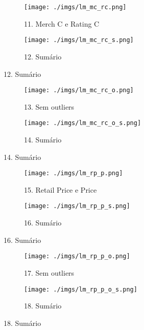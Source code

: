 \documentclass[12pt, a4paper]{article}
\begin{document}
\FloatBarrier
\begin{figure}[h]
  \begin{subfigure}[b]{0.4\textwidth}
    \texttt{[image: ./imgs/lm\_mc\_rc.png]}
    \caption*{11. Merch C e Rating C}
    \label{fig:1}
  \end{subfigure}
  \begin{subfigure}[b]{0.5\textwidth}
    \texttt{[image: ./imgs/lm\_mc\_rc\_s.png]}
    \caption*{12. Sumário}
    \label{fig:2}
  \end{subfigure}
\end{figure}
\FloatBarrier 

\FloatBarrier
\begin{figure}[h]
  \begin{subfigure}[b]{0.4\textwidth}
    \texttt{[image: ./imgs/lm\_mc\_rc\_o.png]}
    \caption*{13. Sem outliers}
    \label{fig:1}
  \end{subfigure}
  \begin{subfigure}[b]{0.5\textwidth}
    \texttt{[image: ./imgs/lm\_mc\_rc\_o\_s.png]}
    \caption*{14. Sumário}
    \label{fig:2}
  \end{subfigure}
\end{figure}
\FloatBarrier 

\FloatBarrier
\begin{figure}[h]
  \hspace{1cm}
  \begin{subfigure}[b]{0.48\textwidth}
    \texttt{[image: ./imgs/lm\_rp\_p.png]}
    \caption*{15. Retail Price e Price}
    \label{fig:1}
  \end{subfigure}
  \begin{subfigure}[b]{0.5\textwidth}
    \texttt{[image: ./imgs/lm\_rp\_p\_s.png]}
    \caption*{16. Sumário}
    \label{fig:2}
  \end{subfigure}
\end{figure}
\FloatBarrier 

\FloatBarrier
\begin{figure}[h]
  \hspace{1.2cm}
  \begin{subfigure}[b]{0.4\textwidth}
    \texttt{[image: ./imgs/lm\_rp\_p\_o.png]}
    \caption*{17. Sem outliers}
    \label{fig:1}
  \end{subfigure}
    \hspace{0.4cm}
  \begin{subfigure}[b]{0.5\textwidth}
    \texttt{[image: ./imgs/lm\_rp\_p\_o\_s.png]}
    \caption*{18. Sumário}
    \label{fig:2}
  \end{subfigure}
\end{figure}
\FloatBarrier
\end{document}
